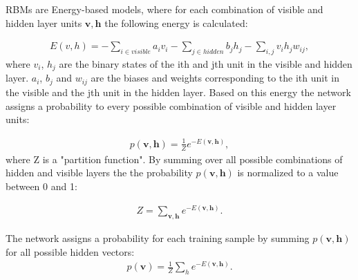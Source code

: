 RBMs are Energy-based models, where for each combination of visible and hidden layer units $\mathbf{v,h}$ the following energy is calculated:

\begin{equation}
\begin{aligned}
    E(v,h) = -\sum_{i \in visible} a_{i}v_{i}-\sum_{j \in hidden} b_{j}h_{j}-\sum_{i,j} v_{i}h_{j}w_{ij},
\end{aligned}
\end{equation}
where $v_{i}$, $h_{j}$ are the binary states of the ith and jth unit in the visible and hidden layer. $a_{i}$, $b_{j}$ and $w_{ij}$ are the biases and weights corresponding to the ith unit in the visible and the jth unit in the hidden layer. Based on this energy the network assigns a probability to every possible combination of visible and hidden layer units:

\begin{equation}
\begin{aligned}
    p(\mathbf{v,h}) = \frac{1}{Z} e^{-E(\mathbf{v,h})},
\end{aligned}
\end{equation}
where Z is a "partition function". By summing over all possible combinations of hidden and visible layers the the probability $p(\mathbf{v,h})$ is normalized to a value between 0 and 1:

\begin{equation}
\begin{aligned}
    Z = \sum_{\mathbf{v,h}}e^{-E(\mathbf{v,h})}.
\end{aligned}
\end{equation}

The network assigns a probability for each training sample by summing $p(\mathbf{v,h})$ for all possible hidden vectors:
\begin{equation}
\begin{aligned}
    p(\mathbf{v}) = \frac{1}{Z} \sum_{h} e^{-E(\mathbf{v,h})}.
    \label{eq:prob_visible_layer}
\end{aligned}
\end{equation}

